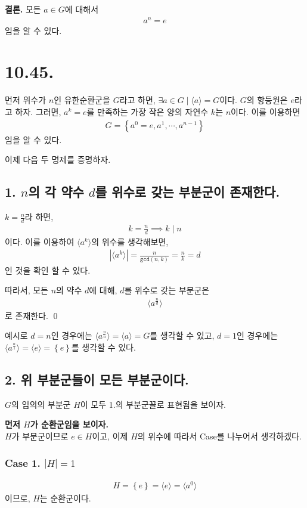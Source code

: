 \documentclass{article}
\begin{document}
\textbf{결론.} 모든 $a \in G$에 대해서 
\begin{align*}
a^n = e
\end{align*}임을 알 수 있다.

\section{10.45.}
먼저 위수가 $n$인 유한순환군을 $G$라고 하면, $\exists a \in G \mid \langle a \rangle = G$이다. $G$의 항등원은 $e$라고 하자. 그러면, $a^k=e$를 만족하는 가장 작은 양의 자연수 $k$는 $n$이다. 이를 이용하면
\begin{align*}
G = \left\{a^0 = e, a^1, \cdots, a^{n-1} \right\}
\end{align*}임을 알 수 있다.

이제 다음 두 명제를 증명하자.
\subsection{1. $n$의 각 약수 $d$를 위수로 갖는 부분군이 존재한다.}
$k = \frac{n}{d}$라 하면,
\begin{align*}
k = \frac{n}{d} \implies k \mid n
\end{align*}이다. 이를 이용하여 $\langle a^k \rangle$의 위수를 생각해보면,
\begin{align*}
\left|\langle a^k \rangle\right| = \frac{n}{\texttt{gcd}(n, k)} = \frac{n}{k} = d
\end{align*}인 것을 확인 할 수 있다.

따라서, 모든 $n$의 약수 $d$에 대해, $d$를 위수로 갖는 부분군은 
\begin{align*}
\langle a^{\frac{n}{d}} \rangle
\end{align*}로 존재한다. \qed

예시로 $d = n$인 경우에는 $\langle a^{\frac{n}{n}} \rangle = \langle a \rangle = G$를 생각할 수 있고, $d = 1$인 경우에는 $\langle a^{\frac{n}{1}} \rangle = \langle e \rangle = \left\{e\right\}$를 생각할 수 있다.


\subsection{2. 위 부분군들이 모든 부분군이다.}
$G$의 임의의 부분군 $H$이 모두 1.의 부분군꼴로 표현됨을 보이자. 

\textbf{먼저 $H$가 순환군임을 보이자.}
\\$H$가 부분군이므로 $e \in H$이고, 이제 $H$의 위수에 따라서 Case를 나누어서 생각하겠다.
\subsubsection{Case 1. $\left|H \right| = 1$}
\begin{align*}
H = \left\{ e \right\} = \langle e \rangle = \langle a^0 \rangle
\end{align*}이므로, $H$는 순환군이다.
\end{document}
